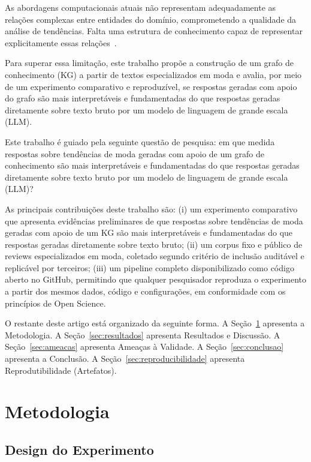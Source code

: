 \documentclass[sigconf]{acmart}
\begin{document}
As abordagens computacionais atuais não representam adequadamente as relações complexas entre entidades do domínio, comprometendo a qualidade da análise de tendências. Falta uma estrutura de conhecimento capaz de representar explicitamente essas relações~\cite{hogan2021}.

Para superar essa limitação, este trabalho propõe a construção de um grafo de conhecimento (KG) a partir de textos especializados em moda e avalia, por meio de um experimento comparativo e reproduzível, se respostas geradas com apoio do grafo são mais interpretáveis e fundamentadas do que respostas geradas diretamente sobre texto bruto por um modelo de linguagem de grande escala (LLM).

Este trabalho é guiado pela seguinte questão de pesquisa: em que medida respostas sobre tendências de moda geradas com apoio de um grafo de conhecimento são mais interpretáveis e fundamentadas do que respostas geradas diretamente sobre texto bruto por um modelo de linguagem de grande escala (LLM)?

As principais contribuições deste trabalho são: (i) um experimento comparativo que apresenta evidências preliminares de que respostas sobre tendências de moda geradas com apoio de um KG são mais interpretáveis e fundamentadas do que respostas geradas diretamente sobre texto bruto; (ii) um corpus fixo e público de reviews especializados em moda, coletado segundo critério de inclusão auditável e replicável por terceiros; (iii) um pipeline completo disponibilizado como código aberto no GitHub, permitindo que qualquer pesquisador reproduza o experimento a partir dos mesmos dados, código e configurações, em conformidade com os princípios de Open Science.

O restante deste artigo está organizado da seguinte forma. A Seção~\ref{sec:metodologia} apresenta a Metodologia. A Seção~\ref{sec:resultados} apresenta Resultados e Discussão. A Seção~\ref{sec:ameacas} apresenta Ameaças à Validade. A Seção~\ref{sec:conclusao} apresenta a Conclusão. A Seção~\ref{sec:reproducibilidade} apresenta Reprodutibilidade (Artefatos).

\section{Metodologia}
\label{sec:metodologia}

\subsection{Design do Experimento}
\end{document}
